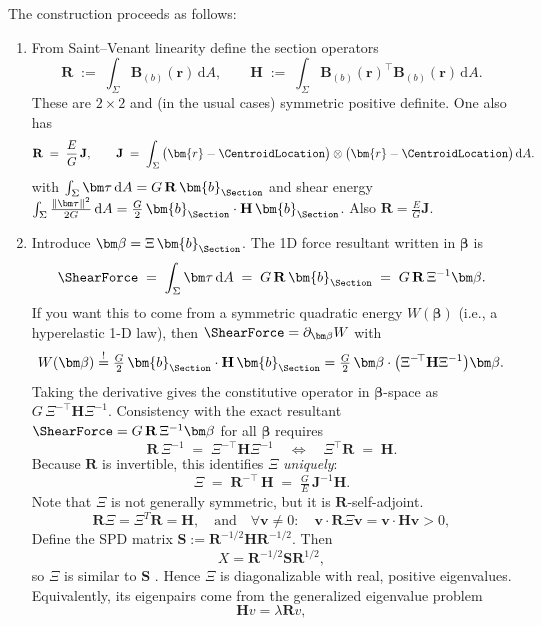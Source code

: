The construction proceeds as follows:
\begin{enumerate}
\item From Saint–Venant linearity define the section operators
  \[
  \mathbf R \;:=\;\int_{\Sigma}\mathbf{B}_{(b)}(\bm{r})\,\mathrm dA,
  \qquad
  \mathbf H \;:=\;\int_{\Sigma}\mathbf{B}_{(b)}(\bm{r})^{\!\top}\mathbf{B}_{(b)}(\bm{r})\,\mathrm dA.
  \]
  These are \(2\times2\) and (in the usual cases) symmetric positive definite. One also has
  \[
  \mathbf R \;=\; \frac{E}{G}\,\mathbf{J},
  \qquad
  \mathbf{J} \;=\; \int_{\Sigma}\big(\bm{r}-\CentroidLocation\big)\otimes\big(\bm{r}-\CentroidLocation\big)\,\mathrm dA.
  \]
with \( \int_\Sigma \bm\tau\,\mathrm dA = G\,\mathbf R\,\bm{b}_{\Section} \) and shear energy \( \int_\Sigma \tfrac{\|\bm\tau\|^2}{2G}\,\mathrm dA = \tfrac{G}{2}\,\bm{b}_{\Section}\cdot\mathbf H\,\bm{b}_{\Section} \). 
Also \( \mathbf R = \tfrac{E}{G}\mathbf{J} \).

\item Introduce \(\bm\beta = \Xi\,\bm{b}_{\Section}\). The 1D force resultant written in \(\bm\beta\) is
\[
\ShearForce \;=\; \int_\Sigma \bm\tau\,\mathrm dA \;=\; G\,\mathbf R\,\bm{b}_{\Section} \;=\; G\,\mathbf R\,\Xi^{-1}\bm\beta.
\]
If you want this to come from a symmetric quadratic energy \(W(\bm\beta)\) (i.e., a hyperelastic 1-D law), then \( \ShearForce = \partial_{\bm\beta} W \) with
\[
W(\bm\beta) \stackrel{!}{=} \tfrac{G}{2}\,\bm{b}_{\Section}\cdot\mathbf H\,\bm{b}_{\Section}
= \tfrac{G}{2}\,\bm\beta \cdot\big(\Xi^{-\!\top}\mathbf H \Xi^{-1}\big)\bm\beta.
\]
Taking the derivative gives the constitutive operator in \(\bm\beta\)-space as \( G\,\Xi^{-\!\top}\mathbf H \Xi^{-1} \). Consistency with the exact resultant \( \ShearForce = G\,\mathbf R\,\Xi^{-1}\bm\beta \) for all \(\bm\beta\) requires
\[
\mathbf R\,\Xi^{-1} \;=\; \Xi^{-\!\top}\mathbf H \Xi^{-1}
\quad\Longleftrightarrow\quad
\Xi^{\!\top}\mathbf R \;=\; \mathbf H.
\]
Because \( \mathbf R \) is invertible, this identifies \(\Xi\) \emph{uniquely}:
\[
\Xi \;=\; \mathbf R^{-\!\top}\,\mathbf H \;=\; \tfrac{G}{E}\,\mathbf{J}^{-1}\mathbf H.
\]
Note that \(\Xi\) is not generally symmetric, but it is \(\mathbf{R}\)-self-adjoint. 
$$
\mathbf{R} \Xi=\Xi^T \mathbf{R}=\mathbf{H},
\quad\text{and}\quad 
\forall \boldsymbol{v} \neq 0: \quad \boldsymbol{v}\cdot \mathbf{R} \Xi \boldsymbol{v}=\boldsymbol{v}\cdot \mathbf{H} \boldsymbol{v}>0,
$$
Define the SPD matrix $\mathbf{S}:=\mathbf{R}^{-1 / 2} \mathbf{H} \mathbf{R}^{-1 / 2}$. 
Then
$$
X=\mathbf{R}^{-1 / 2} \mathbf{S} \mathbf{R}^{1 / 2},
$$
so $\Xi$ is similar to $\mathbf{S}$ . Hence $\Xi$ is diagonalizable with real, positive eigenvalues. Equivalently, its eigenpairs come from the generalized eigenvalue problem
$$
\mathbf{H} v=\lambda \mathbf{R} v,
$$


\end{enumerate}
